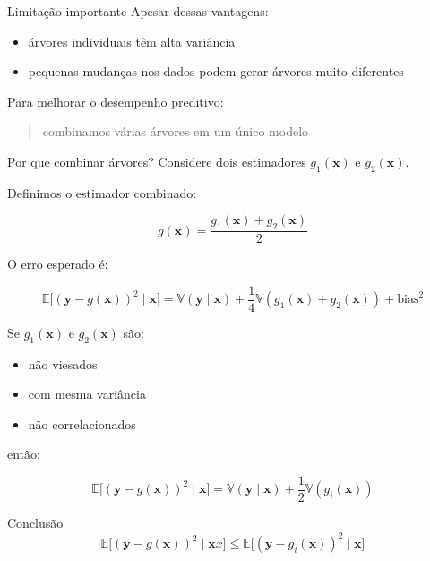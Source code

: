 \documentclass[
  ignorenonframetext,
  aspectratio=169,
]{beamer}
\providecommand{\tightlist}{%
  \setlength{\itemsep}{0pt}\setlength{\parskip}{0pt}}
\begin{document}
\begin{frame}
\begin{block}{Limitação importante}
\label{limitauxe7uxe3o-importante}
Apesar dessas vantagens:

\begin{itemize}
\tightlist
\item
  árvores individuais têm alta variância\\
\item
  pequenas mudanças nos dados podem gerar árvores muito diferentes
\end{itemize}

Para melhorar o desempenho preditivo:

\begin{quote}
combinamos várias árvores em um único modelo
\end{quote}
\end{block}
\end{frame}

\begin{frame}{Por que combinar árvores?}
\label{por-que-combinar-uxe1rvores}
Considere dois estimadores \(g_1(\mathbf{x})\) e \(g_2(\mathbf{x})\).

Definimos o estimador combinado:

\[
g(\mathbf{x}) = \frac{g_1(\mathbf{x}) + g_2(\mathbf{x})}{2}
\]

O erro esperado é:

\[
\mathbb{E}\big[(\boldsymbol{y} - g(\mathbf{x}))^2 \mid \mathbf{x}\big]
=
\mathbb{V}(\boldsymbol{y} \mid \mathbf{x})
+ \frac{1}{4}\mathbb{V}(g_1(\mathbf{x}) + g_2(\mathbf{x}))
+ \text{bias}^2
\]
\end{frame}

\begin{frame}
Se \(g_1(\mathbf{x})\) e \(g_2(\mathbf{x})\) são:

\begin{itemize}
\tightlist
\item
  não viesados\\
\item
  com mesma variância\\
\item
  não correlacionados
\end{itemize}

então:

\[
\mathbb{E}\big[(\boldsymbol{y} - g(\mathbf{x}))^2 \mid \mathbf{x}\big]
=
\mathbb{V}(\boldsymbol{y} \mid \mathbf{x})
+ \frac{1}{2}\mathbb{V}(g_i(\mathbf{x}))
\]

\begin{block}{Conclusão}
\label{conclusuxe3o}
\[
\mathbb{E}\big[(\boldsymbol{y} - g(\mathbf{x}))^2 \mid \mathbf{x}x\big]
\le
\mathbb{E}\big[(\boldsymbol{y} - g_i(\mathbf{x}))^2 \mid \mathbf{x}\big]
\]
\end{block}
\end{frame}
\end{document}
